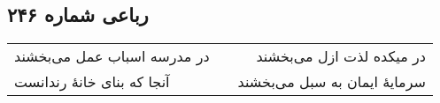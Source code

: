 \begin{center}
\section*{رباعی شماره ۲۴۶}
\label{sec:sh246}
\begin{longtable}{l p{0.5cm} r}
در مدرسه اسباب عمل می‌بخشند
&&
در میکده لذت ازل می‌بخشند
\\
آنجا که بنای خانهٔ رندانست
&&
سرمایهٔ ایمان به سبل می‌بخشند
\\
\end{longtable}
\end{center}
